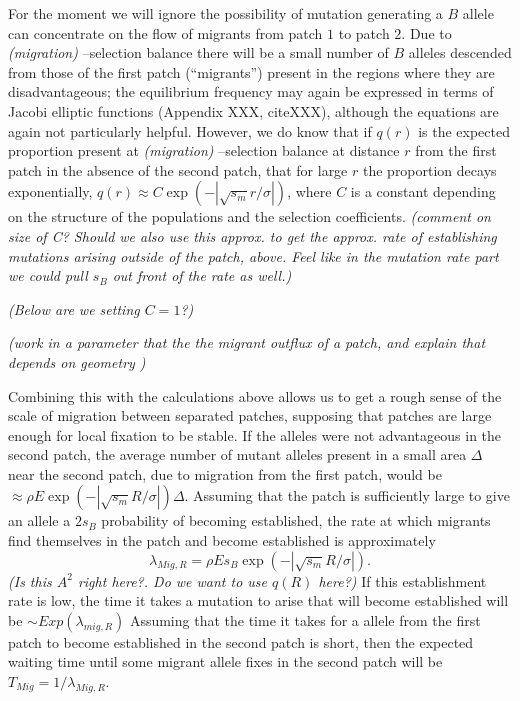 \documentclass{article}
\newcommand{\gc}[1]{{\it\color{green}(#1)} }
\begin{document}
For the moment we will ignore the
possibility of mutation generating a $B$ allele can concentrate on the
flow of migrants from patch $1$ to patch $2$.
Due to \gc{migration}--selection balance there will be a small number of $B$ alleles descended from those of the first patch (``migrants'') 
present in the regions where they are disadvantageous;
the equilibrium frequency may again be expressed in terms of Jacobi elliptic functions (Appendix XXX, citeXXX),
although the equations are again not particularly helpful.
However, we do know that if $q(r)$ is the expected proportion present at \gc{migration}--selection balance at distance $r$ from the first patch
in the absence of the second patch, that for large $r$ the proportion decays exponentially, $q(r) \approx C \exp( -|\sqrt{s_m} r / \sigma|)$,
where $C$ is a constant depending on the structure of the populations
and the selection coefficients. \gc{comment on size of C? Should we
  also use this approx. to get the approx. rate of establishing mutations
  arising outside of the patch, above. Feel like in the mutation rate
  part we could pull $s_B$ out front of the rate as well.} 

\gc{Below are we setting $C=1$?}

\gc{work in a parameter that the the migrant outflux of a patch, and
  explain that depends on geometry }

Combining this with the calculations above allows us to get a rough sense of the scale of migration between separated patches,
supposing that patches are large enough for local fixation to be stable. If the alleles were not advantageous in the second patch,
the average number of mutant alleles present in a small area $\Delta$
near the second patch, due
to migration from the first patch, would be $\approx \rho E \exp( -
|\sqrt{s_m} R/\sigma| ) \Delta$. Assuming that the patch is
sufficiently large to give an allele a $2s_B$ probability of becoming established, the rate at which migrants find
themselves in the patch and become established  is approximately
\begin{equation}
\lambda_{Mig,R} = \rho E s_B \exp( -|\sqrt{s_m} R/\sigma| ).
\end{equation}
\gc{Is this $A^2$ right here?. Do we want to use $q(R)$ here?}
If this establishment rate is low, the time it takes
a mutation to arise that will become established will be  $\sim Exp(\lambda_{mig,R})$
Assuming that the time it takes for a allele from the first patch to
become established in the second patch is short,
then  the expected waiting time until some migrant allele fixes in the
second patch will be $T_{Mig} = 1/ \lambda_{Mig,R} $.
\end{document}
